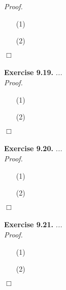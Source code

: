 \documentclass{article}
\begin{document}
\emph{Proof.}
\begin{enumerate}
\item[(1)]
\item[(2)]

\end{enumerate}
$\Box$ \\\\






\textbf{Exercise 9.19.}
\emph{...} \\

\emph{Proof.}
\begin{enumerate}
\item[(1)]
\item[(2)]

\end{enumerate}
$\Box$ \\\\






\textbf{Exercise 9.20.}
\emph{...} \\

\emph{Proof.}
\begin{enumerate}
\item[(1)]
\item[(2)]

\end{enumerate}
$\Box$ \\\\






\textbf{Exercise 9.21.}
\emph{...} \\

\emph{Proof.}
\begin{enumerate}
\item[(1)]
\item[(2)]

\end{enumerate}
$\Box$ \\\\
\end{document}
